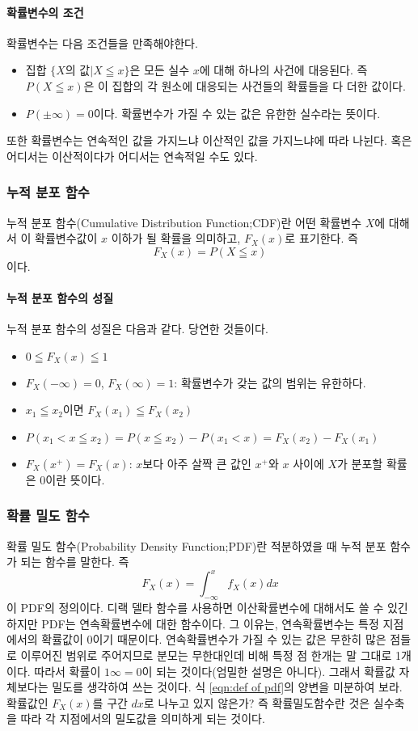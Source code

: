 \paragraph{확률변수의 조건}
확률변수는 다음 조건들을 만족해야한다.
\begin{itemize}
    \item 집합 $\{X\text{의 값}\vert X\leqq x\}$은 모든 실수 $x$에 대해 하나의 사건에 대응된다. 즉 $P(X\leqq x)$은 이 집합의 각 원소에 대응되는 사건들의 확률들을 다 더한 값이다.
    \item $P(\pm  \infty)=0$이다. 확률변수가 가질 수 있는 값은 유한한 실수라는 뜻이다.
\end{itemize}
또한 확률변수는 연속적인 값을 가지느냐 이산적인 값을 가지느냐에 따라 나뉜다. 혹은 어디서는 이산적이다가 어디서는 연속적일 수도 있다.
\subsubsection{누적 분포 함수}
누적 분포 함수(Cumulative Distribution Function;CDF)란 어떤 확률변수 $X$에 대해서 이 확률변수값이 $x$ 이하가 될 확률을 의미하고, $F_X(x)$로 표기한다.
즉
\begin{equation}
    F_X(x)=P(X\leqq x)\label{eqn:def of cdf}
\end{equation}
이다.
\paragraph{누적 분포 함수의 성질}
누적 분포 함수의 성질은 다음과 같다. 당연한 것들이다.
\begin{itemize}
    \item $0\leqq F_X(x)\leqq 1$
    \item $F_X(-\infty)=0$, $F_X(\infty)=1$: 확률변수가 갖는 값의 범위는 유한하다.
    \item $x_1\leqq x_2$이면 $F_X(x_1)\leqq F_X(x_2)$
    \item $P(x_1<x\leqq x_2)=P(x\leqq x_2)-P(x_1<x)=F_X(x_2)-F_X(x_1)$
    \item $F_X(x^+)=F_X(x)$: $x$보다 아주 살짝 큰 값인 $x^+$와 $x$ 사이에 $X$가 분포할 확률은 0이란 뜻이다.
\end{itemize}
\subsubsection{확률 밀도 함수}
확률 밀도 함수(Probability Density Function;PDF)란 적분하였을 때 누적 분포 함수가 되는 함수를 말한다. 즉
\begin{equation}
    F_X(x)=\int_{-\infty}^{x}f_X(x)dx\label{eqn:def of pdf}
\end{equation}
이 PDF의 정의이다.
디랙 델타 함수를 사용하면 이산확률변수에 대해서도 쓸 수 있긴 하지만 PDF는 연속확률변수에 대한 함수이다. 그 이유는, 연속확률변수는 특정 지점에서의 확률값이 0이기 때문이다.
연속확률변수가 가질 수 있는 값은 무한히 많은 점들로 이루어진 범위로 주어지므로 분모는 무한대인데 비해 특정 점 한개는 말 그대로 1개이다. 따라서 확률이 $1\infty=0$이 되는 것이다(엄밀한 설명은 아니다).
그래서 확률값 자체보다는 밀도를 생각하여 쓰는 것이다. 식 \ref{eqn:def of pdf}의 양변을 미분하여 보라. 확률값인 $F_X(x)$를 구간 $dx$로 나누고 있지 않은가?
즉 확률밀도함수란 것은 실수축을 따라 각 지점에서의 밀도값을 의미하게 되는 것이다.
